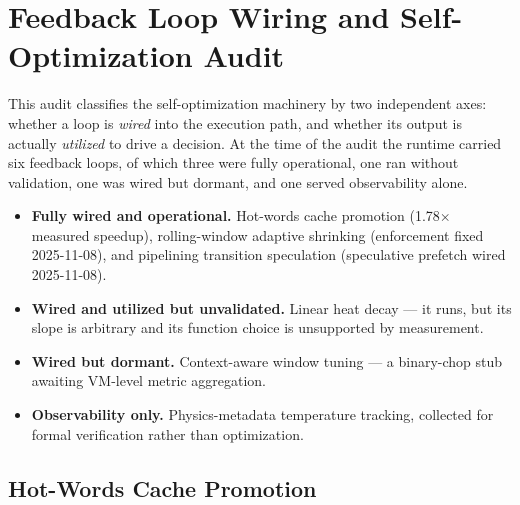 
\section{Feedback Loop Wiring and Self-Optimization Audit}


This audit classifies the self-optimization machinery by two independent axes:
whether a loop is \emph{wired} into the execution path, and whether its output is
actually \emph{utilized} to drive a decision. At the time of the audit the
runtime carried six feedback loops, of which three were fully operational, one
ran without validation, one was wired but dormant, and one served observability
alone.

\begin{itemize}
  \item \textbf{Fully wired and operational.} Hot-words cache promotion
        (1.78$\times$ measured speedup), rolling-window adaptive shrinking
        (enforcement fixed 2025-11-08), and pipelining transition speculation
        (speculative prefetch wired 2025-11-08).
  \item \textbf{Wired and utilized but unvalidated.} Linear heat decay --- it
        runs, but its slope is arbitrary and its function choice is unsupported
        by measurement.
  \item \textbf{Wired but dormant.} Context-aware window tuning --- a binary-chop
        stub awaiting VM-level metric aggregation.
  \item \textbf{Observability only.} Physics-metadata temperature tracking,
        collected for formal verification rather than optimization.
\end{itemize}

\subsection{Hot-Words Cache Promotion}

